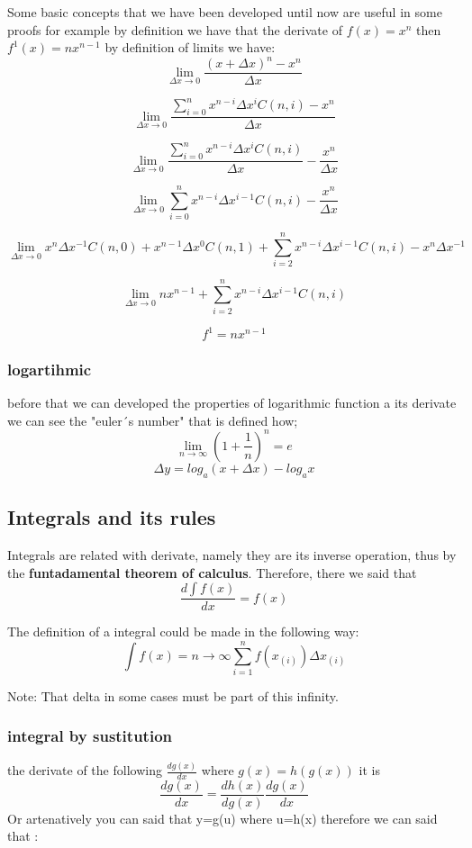 \documentclass[10pt,a4paper]{article}
\begin{document}
Some basic concepts that we have been developed until now are useful in some proofs for example by definition we have that the derivate  of $f(x)= x^{n} $ then $f^{1}(x)=nx^{n-1}$ by definition of limits we have:
$$ \lim_{\Delta x \to 0} \dfrac{(x+\Delta x)^n - x^{n}}{\Delta x} $$

$$\lim_{\Delta x \to 0} \dfrac{ \sum_{i=0}^{n} x^{n-i}\Delta x^{i}C(n,i) - x^{n}} {\Delta x}$$  

$$\lim_{\Delta x \to 0}\dfrac{ \sum_{i=0}^{n} x^{n-i}\Delta x^{i}C(n,i)}{\Delta x} - \dfrac{x^{n}}{\Delta x}$$

$$ \lim_{\Delta x \to 0} \sum_{i=0}^{n} x^{n-i}\Delta x^{i-1}C(n,i) - \dfrac{x^{n}}{\Delta x}$$


$$ \lim_{\Delta x \to 0} x^{n} \Delta x^{-1} C(n,0)+ x^{n-1} \Delta x^{0} C(n,1) +  \sum_{i=2}^{n} x^{n-i} \Delta x^{i-1} C(n,i) - x^{n}\Delta x^{-1}$$


$$ \lim_{\Delta x \to 0} nx^{n-1} + \sum_{i=2}^{n} x^{n-i} \Delta x^{i-1} C(n,i)$$

$$f^{1}=nx^{n-1}$$


\subsubsection*{logartihmic}
before that we can developed the properties of logarithmic function a its derivate we can see the "euler´s number" 
that is defined how; 
$$\lim_{n \to \infty} (1 + \frac{1}{n})^{n} =   e$$
$$\Delta y = log_{a} (x + \Delta x) - log_{a} x$$ 


\subsection*{Integrals and its rules}
Integrals are related with derivate, namely they are its inverse operation, thus by the \textbf{funtadamental theorem of calculus}.  Therefore, there  we said that 
$$ \frac{d \int f(x) }{dx} = f(x)$$

The definition of a integral could be made in the following way:
$$ \int f(x) =  n \to \infty  \sum_{i=1}^{n} f(x_{(i)}) \Delta x_{(i)}$$ 

Note: That delta in some cases must be part of this infinity.

\subsubsection*{integral by sustitution}
the derivate of the following  $\frac{dg(x)}{dx}$ where $g(x)=h(g(x))$ it is
$$\frac{dg(x)}{dx} =  \frac{dh(x)}{dg(x)} \frac{dg(x)}{dx}$$
Or artenatively you can said that y=g(u) where u=h(x) therefore
we can said that : 
\end{document}
